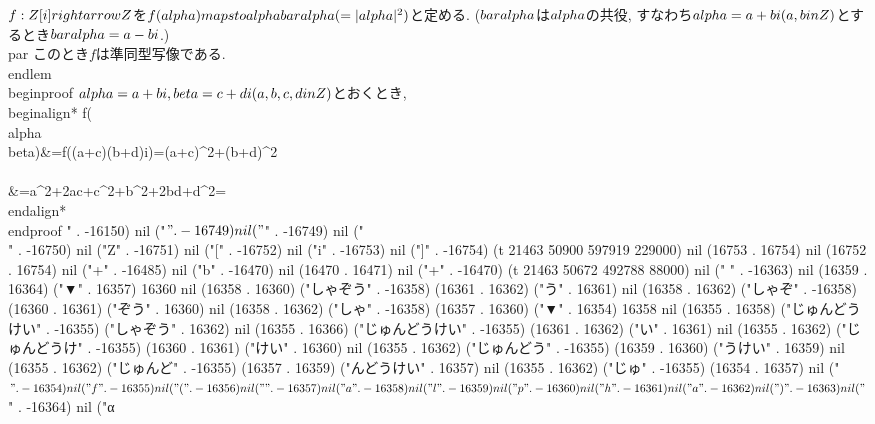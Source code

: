   $f:\\Z[i]\\rightarrow \\Z$を$f(\\alpha)\\mapsto
  \\alpha\\bar{\\alpha}(=|\\alpha|^{2})$と定める.
  ($\\bar{\\alpha}$は$\\alpha$の共役, すなわち$\\alpha=a+bi(a, b\\in \\Z)$とす
  るとき$\\bar{\\alpha}=a-bi$.)
  \\par このとき$f$は準同型写像である.
 \\end{lem}
 \\begin{proof}
  $\\alpha=a+bi, \\beta=c+di(a, b, c, d\\in \\Z)$とおくとき,
  \\begin{align*}
   f(\\alpha\\beta)&=f((a+c)(b+d)i)=(a+c)^{2}+(b+d)^{2}\\\\
   &=a^{2}+2ac+c^{2}+b^{2}+2bd+d^{2}=
  \\end{align*}
 \\end{proof}
" . -16150) nil ("$" . -16749) nil ("$" . -16749) nil ("\\" . -16750) nil ("Z" . -16751) nil ("[" . -16752) nil ("i" . -16753) nil ("]" . -16754) (t 21463 50900 597919 229000) nil (16753 . 16754) nil (16752 . 16754) nil ("+" . -16485) nil ("b" . -16470) nil (16470 . 16471) nil ("+" . -16470) (t 21463 50672 492788 88000) nil (" " . -16363) nil (16359 . 16364) ("▼" . 16357) 16360 nil (16358 . 16360) ("しゃぞう" . -16358) (16361 . 16362) ("う" . 16361) nil (16358 . 16362) ("しゃぞ" . -16358) (16360 . 16361) ("ぞう" . 16360) nil (16358 . 16362) ("しゃ" . -16358) (16357 . 16360) ("▼" . 16354) 16358 nil (16355 . 16358) ("じゅんどうけい" . -16355) ("しゃぞう" . 16362) nil (16355 . 16366) ("じゅんどうけい" . -16355) (16361 . 16362) ("い" . 16361) nil (16355 . 16362) ("じゅんどうけ" . -16355) (16360 . 16361) ("けい" . 16360) nil (16355 . 16362) ("じゅんどう" . -16355) (16359 . 16360) ("うけい" . 16359) nil (16355 . 16362) ("じゅんど" . -16355) (16357 . 16359) ("んどうけい" . 16357) nil (16355 . 16362) ("じゅ" . -16355) (16354 . 16357) nil ("$" . -16354) nil ("f" . -16355) nil ("(" . -16356) nil ("\\" . -16357) nil ("a" . -16358) nil ("l" . -16359) nil ("p" . -16360) nil ("h" . -16361) nil ("a" . -16362) nil (")" . -16363) nil ("$" . -16364) nil ("α

